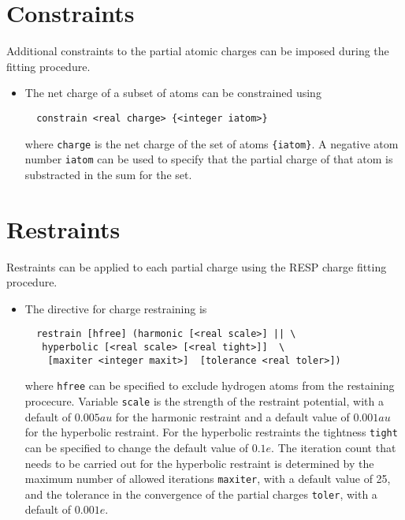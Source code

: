 \section{Constraints}
Additional constraints to the partial atomic charges can be imposed during
the fitting procedure.
\begin{itemize}
\item
The net charge of a subset of atoms can be constrained using
\begin{verbatim}
  constrain <real charge> {<integer iatom>}
\end{verbatim}
where \verb+charge+ is the net charge of the set of atoms \verb+{iatom}+.
A negative atom number \verb+iatom+ can be used to specify that the
partial charge of that atom is substracted in the sum for the set.
\end{itemize}

\section{Restraints}
Restraints can be applied to each partial charge using the RESP charge
fitting procedure.
\begin{itemize}
\item
The directive for charge restraining is
\begin{verbatim}
  restrain [hfree] (harmonic [<real scale>] || \
   hyperbolic [<real scale> [<real tight>]]  \
    [maxiter <integer maxit>]  [tolerance <real toler>])
\end{verbatim}
where \verb+hfree+ can be specified to exclude hydrogen atoms from the
restaining procecure. Variable \verb+scale+ is the strength of the 
restraint potential, with a default of $0.005 au$ for the harmonic
restraint and a default value of $0.001 au$ for the hyperbolic restraint.
For the hyperbolic restraints the tightness \verb+tight+ can be specified
to change the default value of $0.1 e$. The iteration count that needs to
be carried out for the hyperbolic restraint is determined by the
maximum number of allowed iterations \verb+maxiter+, with a default value
of 25, and the tolerance in the convergence of the partial charges
\verb+toler+, with a default of $0.001 e$.
\end{itemize}
